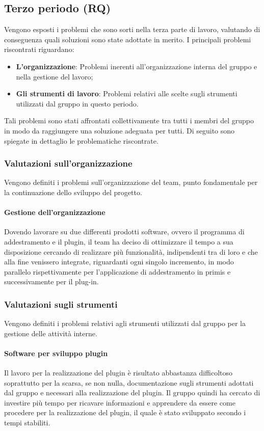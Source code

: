 \documentclass[../piano-di-qualifica.tex]{subfiles}
\begin{document}
\subsection{Terzo periodo (RQ)}
\label{sub:terzo_periodo_rq}
Vengono esposti i problemi che sono sorti nella terza parte di lavoro, valutando di conseguenza quali soluzioni sono state adottate in merito.
I principali problemi riscontrati riguardano:
\begin{itemize}
    \item \textbf{L'organizzazione}: Problemi inerenti all'organizzazione interna del gruppo e nella gestione del lavoro;
    \item \textbf{Gli strumenti di lavoro}: Problemi relativi alle scelte sugli strumenti utilizzati dal gruppo in questo periodo.
\end{itemize}
Tali problemi sono stati affrontati collettivamente tra tutti i membri del gruppo in modo da raggiungere una soluzione adeguata per tutti.
Di seguito sono spiegate in dettaglio le problematiche riscontrate.

\subsubsection{Valutazioni sull’organizzazione}
\label{sssec:valutazioni_organizzazione}
Vengono definiti i problemi sull'organizzazione del team, punto fondamentale per la continuazione dello sviluppo del progetto.

\paragraph{Gestione dell'organizzazione}
\label{sub:gestione_organizzazione}
Dovendo lavorare su due differenti prodotti software, ovvero il programma di addestramento e il plugin, il team ha deciso di ottimizzare il tempo a sua disposizione cercando di realizzare più funzionalità, indipendenti tra di loro e che alla fine venissero integrate, riguardanti ogni singolo incremento, in modo parallelo
rispettivamente per l'applicazione di addestramento in primis e successivamente per il plug-in. 

\subsubsection{Valutazioni sugli strumenti}
\label{sssec:valutazioni_strumenti}
Vengono definiti i problemi relativi agli strumenti utilizzati dal gruppo per la gestione delle attività interne.

\paragraph{Software per sviluppo plugin}
\label{sub:software_sviluppo_plugin}
Il lavoro per la realizzazione del plugin è risultato abbastanza difficoltoso soprattutto per la scarsa, se non nulla, documentazione sugli strumenti adottati dal gruppo e necessari alla realizzazione del plugin.
Il gruppo quindi ha cercato di investire più tempo per ricavare informazioni e apprendere da essere come procedere per la realizzazione del plugin, il quale è stato sviluppato secondo i tempi stabiliti. 
\end{document}
